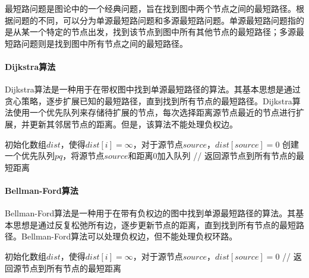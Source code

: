 最短路问题是图论中的一个经典问题，旨在找到图中两个节点之间的最短路径。根据问题的不同，可以分为单源最短路问题和多源最短路问题。单源最短路问题指的是从某一个特定的节点出发，找到该节点到图中所有其他节点的最短路径；多源最短路问题则是找到图中所有节点之间的最短路径。

\paragraph{Dijkstra算法} Dijkstra算法是一种用于在带权图中找到单源最短路径的算法。其基本思想是通过贪心策略，逐步扩展已知的最短路径，直到找到所有节点的最短路径。Dijkstra算法使用一个优先队列来存储待扩展的节点，每次选择距离源节点最近的节点进行扩展，并更新其邻居节点的距离。但是，该算法不能处理负权边。

\begin{algorithm}[htbp]
    \caption{Dijkstra算法}
    初始化数组$dist$，使得$dist[i] = \infty$，对于源节点$source$，$dist[source] = 0$\;
    创建一个优先队列$pq$，将源节点$source$和距离$0$加入队列\;
    \; // 返回源节点到所有节点的最短距离
\end{algorithm}

\paragraph{Bellman-Ford算法} Bellman-Ford算法是一种用于在带有负权边的图中找到单源最短路径的算法。其基本思想是通过反复松弛所有边，逐步更新节点的距离，直到找到所有节点的最短路径。Bellman-Ford算法可以处理负权边，但不能处理负权环路。

\begin{algorithm}[htbp]
    \caption{Bellman-Ford算法}
    初始化数组$dist$，使得$dist[i] = \infty$，对于源节点$source$，$dist[source] = 0$\;
    \; // 返回源节点到所有节点的最短距离
\end{algorithm}

